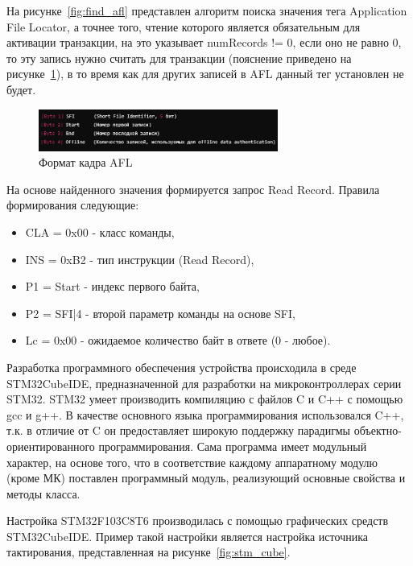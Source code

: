 На рисунке~\ref{fig:find_afl} представлен алгоритм поиска значения тега Application File Locator, а точнее того, чтение которого является обязательным для активации транзакции, на это указывает numRecords != 0, если оно не равно 0, то эту запись нужно считать для транзакции (пояснение приведено на рисунке~\ref{fig:afl_pic}), в то время как для других записей в AFL данный тег установлен не будет.

\begin{figure}[H]
    \centering
    \includegraphics[width=0.7\textwidth]{images/design/afl_pic}
    \caption{\centering Формат кадра AFL}
    \label{fig:afl_pic}
\end{figure}

На основе найденного значения формируется запрос Read Record.
Правила формирования следующие:

\begin{itemize}
    \item CLA = 0x00  - класс команды,
    \item INS = 0xB2 - тип инструкции (Read Record),
    \item P1 = Start - индекс первого байта,
    \item P2 = SFI|4 - второй параметр команды на основе SFI,
    \item Lc = 0x00 - ожидаемое количество байт в ответе (0 - любое).
\end{itemize}

Разработка программного обеспечения устройства происходила в среде STM32CubeIDE, предназначенной для разработки на микроконтроллерах серии STM32.
STM32 умеет производить компиляцию с файлов C и C++ с помощью gcc и g++.
В качестве основного языка программирования использовался C++, т.к. в отличие от C он предоставляет широкую поддержку парадигмы объектно-ориентированного программирования.
Сама программа имеет модульный характер, на основе того, что в соответствие каждому аппаратному модулю (кроме МК) поставлен программный модуль, реализующий основные свойства и методы класса.

Настройка STM32F103C8T6 производилась с помощью графических средств STM32CubeIDE. Пример такой настройки является настройка источника тактирования, представленная на рисунке~\ref{fig:stm_cube}.


